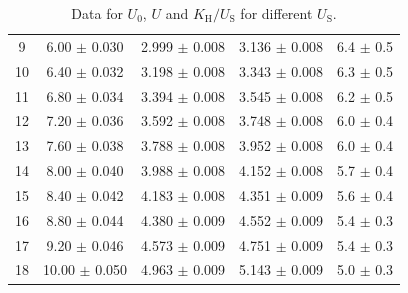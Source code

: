 \documentclass[a4paper]{article}
\begin{document}
\begin{table}[htbp]
\begin{tabular}{c|cccc}
		9  & 6.00 $\pm$ 0.030                                    & 2.999 $\pm$ 0.008                                                  & 3.136 $\pm$ 0.008                                               & 6.4 $\pm$ 0.5                               \\
		10 & 6.40 $\pm$ 0.032                                    & 3.198 $\pm$ 0.008                                                  & 3.343 $\pm$ 0.008                                               & 6.3 $\pm$ 0.5                               \\
		11 & 6.80 $\pm$ 0.034                                    & 3.394 $\pm$ 0.008                                                  & 3.545 $\pm$ 0.008                                               & 6.2 $\pm$ 0.5                               \\
		12 & 7.20 $\pm$ 0.036                                    & 3.592 $\pm$ 0.008                                                  & 3.748 $\pm$ 0.008                                               & 6.0 $\pm$ 0.4                               \\
		13 & 7.60 $\pm$ 0.038                                    & 3.788 $\pm$ 0.008                                                  & 3.952 $\pm$ 0.008                                               & 6.0 $\pm$ 0.4                               \\
		14 & 8.00 $\pm$ 0.040                                    & 3.988 $\pm$ 0.008                                                  & 4.152 $\pm$ 0.008                                               & 5.7 $\pm$ 0.4                               \\
		15 & 8.40 $\pm$ 0.042                                    & 4.183 $\pm$ 0.008                                                  & 4.351 $\pm$ 0.009                                               & 5.6 $\pm$ 0.4                               \\
		16 & 8.80 $\pm$ 0.044                                    & 4.380 $\pm$ 0.009                                                  & 4.552 $\pm$ 0.009                                               & 5.4 $\pm$ 0.3                               \\
		17 & 9.20 $\pm$ 0.046                                    & 4.573 $\pm$ 0.009                                                  & 4.751 $\pm$ 0.009                                               & 5.4 $\pm$ 0.3                               \\
		18 & 10.00 $\pm$ 0.050                                   & 4.963 $\pm$ 0.009                                                  & 5.143 $\pm$ 0.009                                               & 5.0 $\pm$ 0.3                               \\
		\hline
	\end{tabular}
	\caption{Data for $U_0$, $U$ and $K_\text{H}/U_\text{S}$ for different $U_\text{S}$.}
	\label{table::e1}
\end{table}
\end{document}
